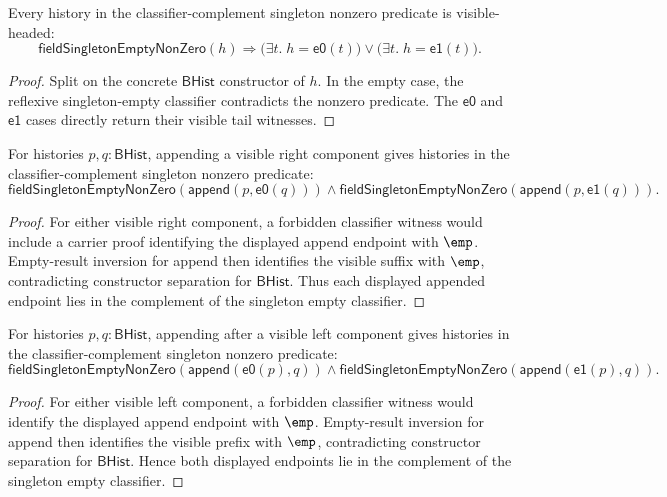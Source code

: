 \begin{theorem}
\label{thm:field-singleton-empty-nonzero-visible-cases}
Every history in the classifier-complement singleton nonzero predicate is
visible-headed:
$$
\mathsf{fieldSingletonEmptyNonZero}(h)\Rightarrow
\bigl(\exists t.\;h=\mathsf{e0}(t)\bigr)\lor
\bigl(\exists t.\;h=\mathsf{e1}(t)\bigr).
$$
\end{theorem}
\begin{proof}
Split on the concrete $\mathsf{BHist}$ constructor of $h$. In the empty case,
the reflexive singleton-empty classifier contradicts the nonzero predicate. The
$\mathsf{e0}$ and $\mathsf{e1}$ cases directly return their visible tail
witnesses.
\end{proof}

\begin{theorem}
\label{thm:field-singleton-empty-nonzero-append-visible-right}
For histories $p,q:\mathsf{BHist}$, appending a visible right component gives
histories in the classifier-complement singleton nonzero predicate:
$$
\mathsf{fieldSingletonEmptyNonZero}(\mathsf{append}(p,\mathsf{e0}(q)))
\land
\mathsf{fieldSingletonEmptyNonZero}(\mathsf{append}(p,\mathsf{e1}(q))).
$$
\end{theorem}
\begin{proof}
For either visible right component, a forbidden classifier witness would
include a carrier proof identifying the displayed append endpoint with
$\emp$. Empty-result inversion for append then identifies the visible suffix
with $\emp$, contradicting constructor separation for $\mathsf{BHist}$. Thus
each displayed appended endpoint lies in the complement of the singleton empty
classifier.
\end{proof}

\begin{theorem}
\label{thm:field-singleton-empty-nonzero-append-visible-left}
For histories $p,q:\mathsf{BHist}$, appending after a visible left component
gives histories in the classifier-complement singleton nonzero predicate:
$$
\mathsf{fieldSingletonEmptyNonZero}(\mathsf{append}(\mathsf{e0}(p),q))
\land
\mathsf{fieldSingletonEmptyNonZero}(\mathsf{append}(\mathsf{e1}(p),q)).
$$
\end{theorem}
\begin{proof}
For either visible left component, a forbidden classifier witness would
identify the displayed append endpoint with $\emp$. Empty-result inversion for
append then identifies the visible prefix with $\emp$, contradicting
constructor separation for $\mathsf{BHist}$. Hence both displayed endpoints
lie in the complement of the singleton empty classifier.
\end{proof}

